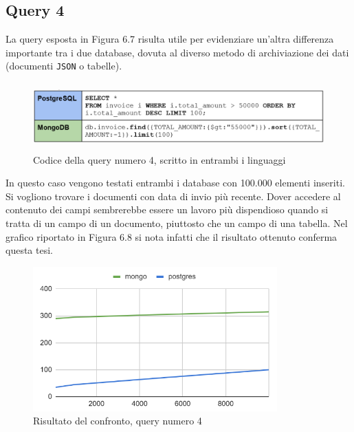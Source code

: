 
\subsection{Query 4}
La query esposta in Figura 6.7 risulta utile per evidenziare un'altra differenza importante tra i due database, dovuta al diverso metodo di archiviazione dei dati (documenti \texttt{JSON} o tabelle).\\

\begin{figure}[htbp]
\begin{center}
\includegraphics[height=7em]{immagini/query/query4.png}
\caption{Codice della query numero 4, scritto in entrambi i linguaggi}
\end{center}
\end{figure}

\noindent In questo caso vengono testati entrambi i database con 100.000 elementi inseriti.\\
Si vogliono trovare i documenti con data di invio più recente. Dover accedere al contenuto dei campi sembrerebbe essere un lavoro più dispendioso quando si tratta di un campo di un documento, piuttosto che un campo di una tabella. Nel grafico riportato in Figura 6.8 si nota infatti che il risultato ottenuto conferma questa tesi.\\

\begin{figure}[htbp]
\begin{center}
\includegraphics[height=15em]{immagini/query/query4_results.png}
\caption{Risultato del confronto, query numero 4}
\end{center}
\end{figure}

